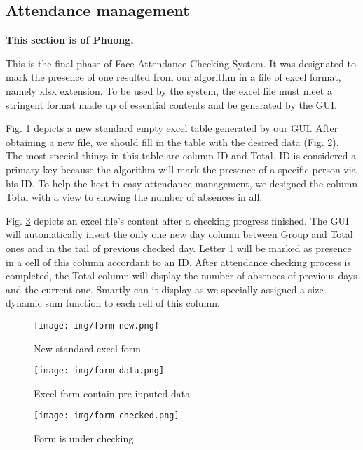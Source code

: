 \documentclass[journal, twocolumn]{IEEEtran}
\begin{document}
\subsection{Attendance management}
\label{attendance-management}
\textbf{This section is of Phuong.}

This is the final phase of Face Attendance Checking System.
It was designated to mark the presence of one resulted from
our algorithm in a file of excel format, namely xlsx extension.
To be used by the system, the excel file must meet
a stringent format made up of essential contents and be
generated by the GUI. 

Fig. \ref{fig:form-new} depicts a new standard empty
excel table generated by our GUI. After obtaining a new file, we should fill in the table with the desired data (Fig. \ref{fig:form-data}). The most special things in this table are column ID and Total. 
ID is considered a primary key because the algorithm will mark the presence of a specific person via his ID. 
To help the host in easy attendance management, we designed the column Total with a view to showing the number of absences in all.

Fig. \ref{fig:form-checked} depicts an excel file's content after a checking progress finished. 
The GUI will automatically insert the only one new day column between Group and Total ones and in the tail of previous checked day. 
Letter 1 will be marked as presence in a cell of this column accordant to an ID. 
After attendance checking process is completed, the Total column will display the number of absences of previous days and the current one. Smartly can it display as we specially assigned a size-dynamic sum function to each cell of this column.


\begin{figure}
    \centering
    \texttt{[image: img/form-new.png]}
	\caption{New standard excel form}\label{fig:form-new}
\end{figure}

\begin{figure}
    \centering
    \texttt{[image: img/form-data.png]}
	\caption{Excel form contain pre-inputed data}\label{fig:form-data}
\end{figure}

\begin{figure}
    \centering
    \texttt{[image: img/form-checked.png]}
	\caption{Form is under checking}\label{fig:form-checked}
\end{figure}
\end{document}
